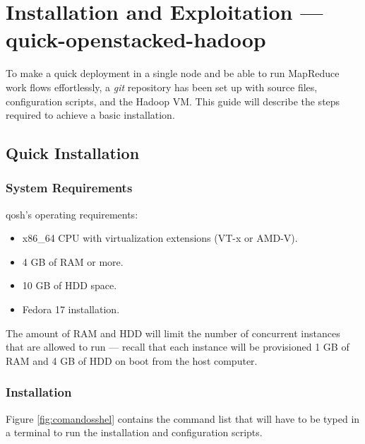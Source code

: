 \chapter{Installation and Exploitation --- quick-openstacked-hadoop}\label{cap:guiainstalacion}
\noindent To make a quick deployment in a single node and be able to run MapReduce work flows effortlessly, a \emph{git} repository has been set up with source files, configuration scripts, and the Hadoop VM. This guide will describe the steps required to achieve a basic installation.

\section{Quick Installation}\label{sec:instalacionqosh}

\subsection{System Requirements}\label{subsec:reqsis}
\noindent qosh's operating requirements:

\begin{itemize}
    \item x86\_64 CPU with virtualization extensions (VT-x or AMD-V).
    \item 4 GB of RAM or more.
    \item 10 GB of HDD space.
    \item Fedora 17 installation.
\end{itemize}

The amount of RAM and HDD will limit the number of concurrent instances that are allowed to run --- recall that each instance will be provisioned 1 GB of RAM and 4 GB of HDD on boot from the host computer.

\subsection{Installation}\label{subsec:instalacion}
\noindent Figure \ref{fig:comandosshel} contains the command list that will have to be typed in a terminal to run the installation and configuration scripts.

